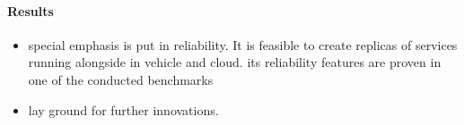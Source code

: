 \noindent
\paragraph{Results}
\begin{itemize}
\item special emphasis is put in reliability. It is feasible to create replicas of services running alongside in vehicle and cloud.
its reliability features are proven in one of the conducted benchmarks
\item lay ground for further innovations.
\end{itemize}
